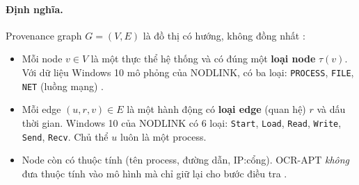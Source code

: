 \paragraph{Định nghĩa.}
Provenance graph $G = (V, E)$ là đồ thị có hướng, không đồng nhất \cite[§2]{aly2025ocrapt}:
\begin{itemize}
    \item Mỗi node $v \in V$ là một thực thể hệ thống và có đúng một \textbf{loại node} $\tau(v)$. Với dữ liệu Windows 10 mô phỏng của NODLINK, có ba loại: \texttt{PROCESS}, \texttt{FILE}, \texttt{NET} (luồng mạng) \cite{ocrapt_repo}.
    \item Mỗi edge $(u, r, v) \in E$ là một hành động có \textbf{loại edge} (quan hệ) $r$ và dấu thời gian. Windows 10 của NODLINK có 6 loại: \texttt{Start}, \texttt{Load}, \texttt{Read}, \texttt{Write}, \texttt{Send}, \texttt{Recv}. Chủ thể $u$ luôn là một process.
    \item Node còn có thuộc tính (tên process, đường dẫn, IP:cổng). OCR-APT \emph{không} đưa thuộc tính vào mô hình mà chỉ giữ lại cho bước điều tra \cite[§5.1.1]{aly2025ocrapt}.
\end{itemize}

